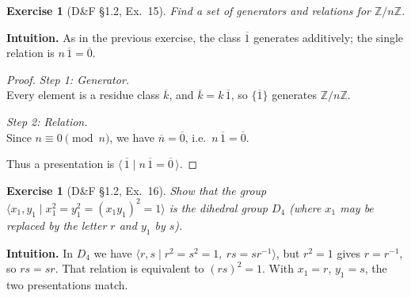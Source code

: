 \documentclass[12pt]{article}
\newtheorem{exercise}[theorem]{Exercise}
\theoremstyle{definition}
\begin{document}
\newpage

\begin{exercise}[D\&F §1.2, Ex.~15]
Find a set of generators and relations for $\mathbb{Z}/n\mathbb{Z}$.
\end{exercise}

\dotfill

\noindent
\textbf{Intuition.}
As in the previous exercise, the class $\overline{1}$ generates additively; the single relation is $n\,\overline{1}=\overline{0}$.

\dotfill

\begin{proof}
\noindent\emph{Step 1: Generator.}\\
Every element is a residue class $\overline{k}$, and $\overline{k}=k\,\overline{1}$, so $\{\overline{1}\}$ generates $\mathbb{Z}/n\mathbb{Z}$.

\dotfill

\noindent\emph{Step 2: Relation.}\\
Since $n\equiv 0\pmod n$, we have $\overline{n}=\overline{0}$, i.e.\ $n\,\overline{1}=\overline{0}$.

\dotfill

Thus a presentation is $\langle\,\overline{1}\mid n\,\overline{1}=\overline{0}\,\rangle$.
\end{proof}

\newpage

\begin{exercise}[D\&F §1.2, Ex.~16]
Show that the group $\langle x_1, y_1 \mid x_1^{2}=y_1^{2}=(x_1y_1)^{2}=1\rangle$ is the dihedral group $D_{4}$
(where $x_1$ may be replaced by the letter $r$ and $y_1$ by $s$).
\end{exercise}

\dotfill

\noindent
\textbf{Intuition.}
In $D_{4}$ we have $\langle r,s\mid r^{2}=s^{2}=1,\ rs=sr^{-1}\rangle$, but $r^{2}=1$ gives $r=r^{-1}$, so $rs=sr$.
That relation is equivalent to $(rs)^{2}=1$. With $x_1=r$, $y_1=s$, the two presentations match.

\dotfill
\end{document}
